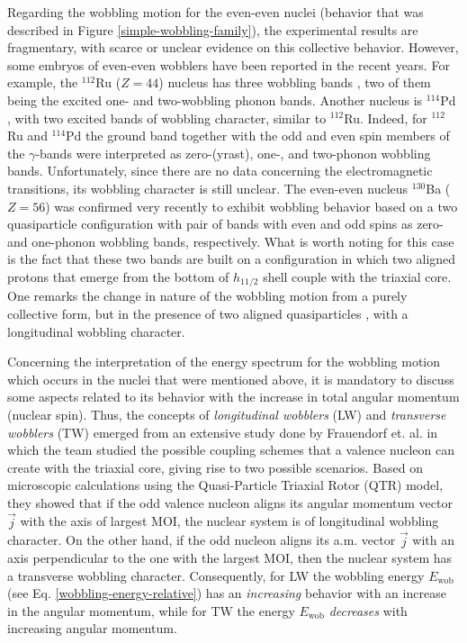 \documentclass[11pt]{article}
\begin{document}
Regarding the wobbling motion for the even-even nuclei (behavior that was described in Figure \ref{simple-wobbling-family}), the experimental results are fragmentary, with scarce or unclear evidence on this collective behavior. However, some embryos of even-even wobblers have been reported in the recent years. For example, the $^{112}$Ru ($Z=44$) nucleus has three wobbling bands \cite{hamilton2010super}, two of them being the excited one- and two-wobbling phonon bands. Another nucleus is $^{114}$Pd \cite{luo2013triaxial}, with two excited bands of wobbling character, similar to $^{112}$Ru. Indeed, for $^{112}$Ru and $^{114}$Pd the ground band together with the odd and even spin members of the $\gamma$-bands were interpreted as zero-(yrast), one-, and two-phonon wobbling bands. Unfortunately, since there are no data concerning the electromagnetic transitions, its wobbling character is still unclear. The even-even nucleus $^{130}$Ba ($Z=56$) \cite{petrache2019diversity,wang2020two,chen2019transverse} was confirmed very recently to exhibit wobbling behavior based on a two quasiparticle configuration with pair of bands with even and odd spins as zero- and one-phonon wobbling bands, respectively. What is worth noting for this case is the fact that these two bands are built on a configuration in which two aligned protons that emerge from the bottom of $h_{11/2}$ shell couple with the triaxial core. One remarks the change in nature of the wobbling motion from a purely collective form, but in the presence of two aligned quasiparticles \cite{wang2020two}, with a longitudinal wobbling character. 

Concerning the interpretation of the energy spectrum for the wobbling motion which occurs in the nuclei that were mentioned above, it is mandatory to discuss some aspects related to its behavior with the increase in total angular momentum (nuclear spin). Thus, the concepts of \emph{longitudinal wobblers} (LW) and \emph{transverse wobblers} (TW) emerged from an extensive study done by Frauendorf et. al. \cite{frauendorf2014transverse} in which the team studied the possible coupling schemes that a valence nucleon can create with the triaxial core, giving rise to two possible scenarios. Based on microscopic calculations using the Quasi-Particle Triaxial Rotor (QTR) model, they showed that if the odd valence nucleon aligns its angular momentum vector $\vec{j}$ with the axis of largest MOI, the nuclear system is of longitudinal wobbling character. On the other hand, if the odd nucleon aligns its a.m. vector $\vec{j}$ with an axis perpendicular to the one with the largest MOI, then the nuclear system has a transverse wobbling character. Consequently, for LW the wobbling energy $E_\text{wob}$ (see Eq. \ref{wobbling-energy-relative}) has an \emph{increasing} behavior with an increase in the angular momentum, while for TW the energy $E_\text{wob}$ \emph{decreases} with increasing angular momentum.
\end{document}

